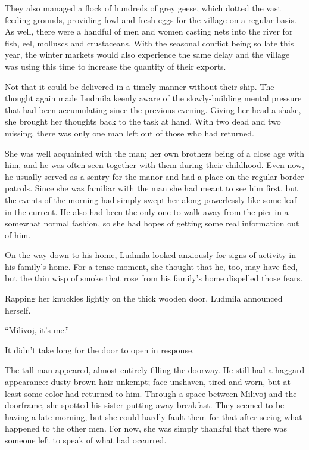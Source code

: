  

They also managed a flock of hundreds of grey geese, which dotted the vast feeding grounds, providing fowl and fresh eggs for the village on a regular basis. As well, there were a handful of men and women casting nets into the river for fish, eel, molluscs and crustaceans. With the seasonal conflict being so late this year, the winter markets would also experience the same delay and the village was using this time to increase the quantity of their exports.

 

Not that it could be delivered in a timely manner without their ship. The thought again made Ludmila keenly aware of the slowly-building mental pressure that had been accumulating since the previous evening. Giving her head a shake, she brought her thoughts back to the task at hand. With two dead and two missing, there was only one man left out of those who had returned.

 

She was well acquainted with the man; her own brothers being of a close age with him, and he was often seen together with them during their childhood. Even now, he usually served as a sentry for the manor and had a place on the regular border patrols. Since she was familiar with the man she had meant to see him first, but the events of the morning had simply swept her along powerlessly like some leaf in the current. He also had been the only one to walk away from the pier in a somewhat normal fashion, so she had hopes of getting some real information out of him.

 

On the way down to his home, Ludmila looked anxiously for signs of activity in his family’s home. For a tense moment, she thought that he, too, may have fled, but the thin wisp of smoke that rose from his family's home dispelled those fears.

 

Rapping her knuckles lightly on the thick wooden door, Ludmila announced herself.

 

“Milivoj, it’s me.”

 

It didn't take long for the door to open in response.

 

The tall man appeared, almost entirely filling the doorway. He still had a haggard appearance: dusty brown hair unkempt; face unshaven, tired and worn, but at least some color had returned to him. Through a space between Milivoj and the doorframe, she spotted his sister putting away breakfast. They seemed to be having a late morning, but she could hardly fault them for that after seeing what happened to the other men. For now, she was simply thankful that there was someone left to speak of what had occurred.


